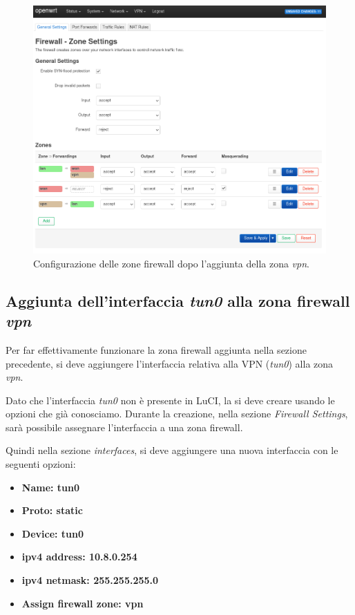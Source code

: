 \begin{figure}[H]
    \centering
    \includegraphics[width=1\linewidth]{immagini/LuCI_firewall_end1}
    \caption{Configurazione delle zone firewall dopo l'aggiunta della zona \textit{vpn}.}
    \label{fig:luci-firewall-end}
\end{figure}

\subsection{Aggiunta dell'interfaccia \textit{tun0} alla zona firewall \textit{vpn} \ok}
\label{subsec:aggiunta-interfaccia-tun0-zona-vpn}

Per far effettivamente funzionare la zona firewall aggiunta nella sezione precedente, si deve aggiungere l'interfaccia relativa alla VPN (\textit{tun0}) alla zona \textit{vpn}.

Dato che l'interfaccia \textit{tun0} non è presente in LuCI, la si deve creare usando le opzioni che già conosciamo. Durante la creazione, nella sezione \textit{Firewall Settings}, sarà possibile assegnare l'interfaccia a una zona firewall.

Quindi nella sezione \textit{interfaces}, si deve aggiungere una nuova interfaccia con le seguenti opzioni:

\begin{itemize}
    \item \bf{Name}: tun0
    \item \bf{Proto}: static
    \item \bf{Device}: tun0
    \item \bf{ipv4 address}: 10.8.0.254
    \item \bf{ipv4 netmask}: 255.255.255.0
    \item \bf{Assign firewall zone}: vpn
\end{itemize}

